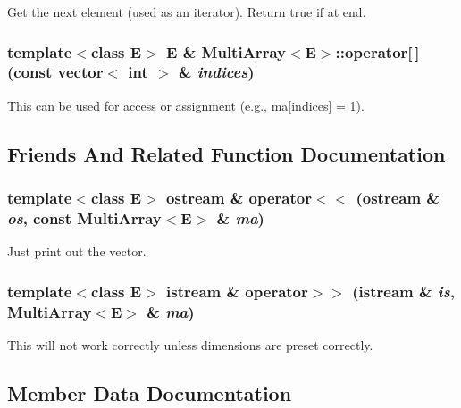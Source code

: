 Get the next element (used as an iterator). Return true if at end.

\subsubsection{\setlength{\rightskip}{0pt plus 5cm}template$<$class E$>$ E \& Multi\-Array$<$E$>$::operator[$\,$] (const vector$<$ int $>$ \& {\em indices})\hspace{0.3cm}{\tt  [inline]}}\label{classMultiArray_a4}


This can be used for access or assignment (e.g., ma[indices] = 1).



\subsection{Friends And Related Function Documentation}
\subsubsection{\setlength{\rightskip}{0pt plus 5cm}template$<$class E$>$ ostream \& operator$<$$<$ (ostream \& {\em os}, const Multi\-Array$<$E$>$ \& {\em ma})\hspace{0.3cm}{\tt  [friend]}}\label{classMultiArray_l1}


Just print out the vector.

\subsubsection{\setlength{\rightskip}{0pt plus 5cm}template$<$class E$>$ istream \& operator$>$$>$ (istream \& {\em is}, Multi\-Array$<$E$>$ \& {\em ma})\hspace{0.3cm}{\tt  [friend]}}\label{classMultiArray_l0}


This will not work correctly unless dimensions are preset correctly.



\subsection{Member Data Documentation}
